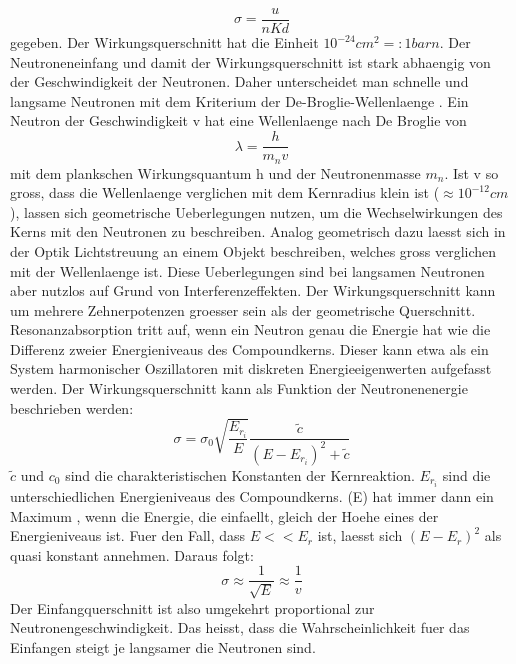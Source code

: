 \documentclass[titlepage=firstcover, captions=tableheading]{scrartcl}
\begin{document}
\begin{equation}
    \sigma =\frac{u}{nKd} \nonumber
\end{equation}
gegeben. Der Wirkungsquerschnitt hat die Einheit $10^{-24}cm^2=:1 barn$. Der Neutroneneinfang und damit der Wirkungsquerschnitt ist stark abhaengig von der Geschwindigkeit der Neutronen. Daher unterscheidet man schnelle und langsame Neutronen mit dem Kriterium der De-Broglie-Wellenlaenge \lambda.  Ein Neutron der Geschwindigkeit v hat eine Wellenlaenge nach De Broglie von
\begin{equation} 
    \lambda=\frac{h}{m_nv} \nonumber
\end{equation}
mit dem plankschen Wirkungsquantum h und der Neutronenmasse $m_n$. Ist v so gross, dass die Wellenlaenge verglichen mit dem Kernradius klein ist ($\approx 10^{-12}cm$), lassen sich geometrische Ueberlegungen nutzen, um die Wechselwirkungen des Kerns mit den Neutronen zu beschreiben. Analog geometrisch dazu laesst sich in der Optik Lichtstreuung an einem Objekt beschreiben, welches gross verglichen mit der Wellenlaenge ist. Diese Ueberlegungen sind bei langsamen Neutronen aber nutzlos auf Grund von Interferenzeffekten. Der Wirkungsquerschnitt kann um mehrere Zehnerpotenzen groesser sein als der geometrische Querschnitt. Resonanzabsorption tritt auf, wenn ein Neutron genau die Energie hat wie die Differenz zweier Energieniveaus des Compoundkerns. Dieser kann etwa als ein System harmonischer Oszillatoren mit diskreten Energieeigenwerten aufgefasst werden. Der Wirkungsquerschnitt kann als Funktion der Neutronenenergie beschrieben werden:
\begin{equation}
    \sigma=\sigma_0\sqrt{\frac{E_{r_{i}}}{E}}\frac{\tilde{c}}{(E-E_{r_{i}})^2+\tilde{c}} \nonumber
\end{equation}
$\tilde{c}$ und $c_0$ sind die charakteristischen Konstanten der Kernreaktion. $E_{r_{i}}$ sind die unterschiedlichen Energieniveaus des Compoundkerns. \sigma(E) hat immer dann ein Maximum , wenn die Energie, die einfaellt, gleich der Hoehe eines der Energieniveaus ist. Fuer den Fall, dass $E<<E_r$ ist, laesst sich $(E-E_r)^2$ als quasi konstant annehmen. Daraus folgt:
\begin{equation}
    \sigma\approx\frac{1}{\sqrt{E}}\approx\frac{1}{v} \nonumber
\end{equation}
Der Einfangquerschnitt ist also umgekehrt proportional zur Neutronengeschwindigkeit. Das heisst, dass die Wahrscheinlichkeit fuer das Einfangen steigt je langsamer die Neutronen sind.
\end{document}
